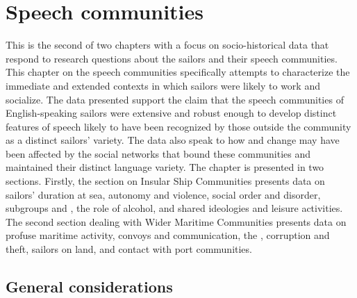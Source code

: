 \chapter{{Speech communities}}

This is the second of two chapters with a focus on socio-historical data that respond to research questions about the sailors and their speech communities. This chapter on the speech communities specifically attempts to characterize the immediate and extended contexts in which sailors were likely to work and socialize. The data presented support the claim that the speech communities of English-speaking sailors were extensive and robust enough to develop distinct features of speech likely to have been recognized by those outside the community as a distinct sailors’ variety. The data also speak to how  and change may have been affected by the social networks that bound these communities and maintained their distinct language variety. The chapter is presented in two sections. Firstly, the section on Insular Ship Communities presents data on sailors’ duration at sea, autonomy and violence, social order and disorder, subgroups and , the role of alcohol, and shared ideologies and leisure activities. The second section dealing with Wider Maritime Communities presents data on profuse maritime activity, convoys and communication, the , corruption and theft, sailors on land, and contact with port communities. 

\section{{General considerations}}\label{sec:4.1}

